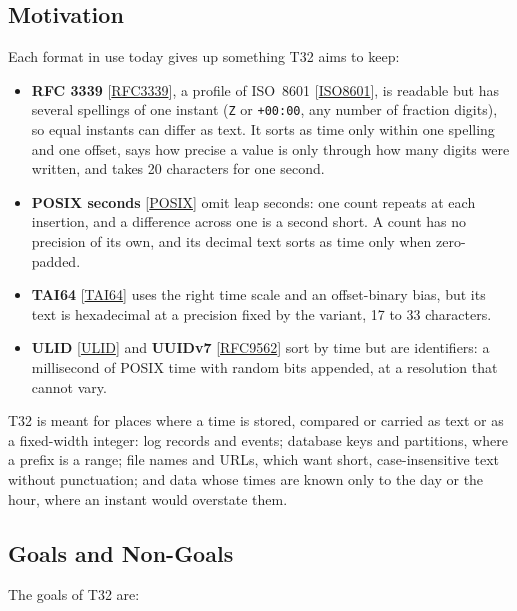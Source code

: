 \documentclass[11pt]{article}
\newcommand{\lit}[1]{\texttt{#1}}
\newcommand{\xref}[1]{[\hyperref[ref:#1]{#1}]}
\begin{document}
\subsection{Motivation}\label{sec:motivation}

Each format in use today gives up something T32 aims to keep:

\begin{itemize}
\item \textbf{RFC 3339} \xref{RFC3339}, a profile of ISO~8601 \xref{ISO8601},
is readable but has several spellings of one instant (\lit{Z} or
\lit{+00:00}, any number of fraction digits), so equal instants can differ as
text. It sorts as time only within one spelling and one offset, says how
precise a value is only through how many digits were written, and takes 20
characters for one second.
\item \textbf{POSIX seconds} \xref{POSIX} omit leap seconds: one count repeats
at each insertion, and a difference across one is a second short. A count has
no precision of its own, and its decimal text sorts as time only when
zero-padded.
\item \textbf{TAI64} \xref{TAI64} uses the right time scale and an
offset-binary bias, but its text is hexadecimal at a precision fixed by the
variant, 17 to 33 characters.
\item \textbf{ULID} \xref{ULID} and \textbf{UUIDv7} \xref{RFC9562} sort by
time but are identifiers: a millisecond of POSIX time with random bits
appended, at a resolution that cannot vary.
\end{itemize}

T32 is meant for places where a time is stored, compared or carried as text or
as a fixed-width integer: log records and events; database keys and
partitions, where a prefix is a range; file names and URLs, which want short,
case-insensitive text without punctuation; and data whose times are known only
to the day or the hour, where an instant would overstate them.

\subsection{Goals and Non-Goals}

The goals of T32 are:
\end{document}
